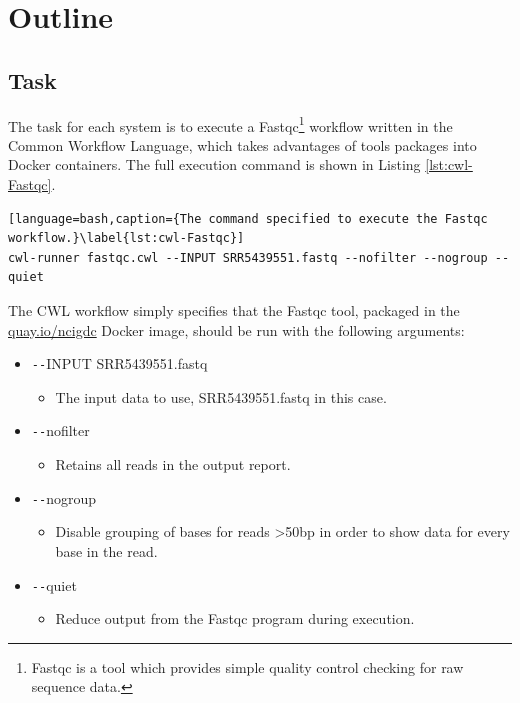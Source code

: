 \section{Outline}

\subsection{Task}

The task for each system is to execute a Fastqc\footnote{Fastqc is a tool which provides simple quality control checking for raw sequence data.} workflow written in the Common Workflow Language, which takes advantages of tools packages into Docker containers. The full execution command is shown in Listing \ref{lst:cwl-Fastqc}.

\begin{lstlisting}[language=bash,caption={The command specified to execute the Fastqc workflow.}\label{lst:cwl-Fastqc}]
cwl-runner fastqc.cwl --INPUT SRR5439551.fastq --nofilter --nogroup --quiet
\end{lstlisting}

The CWL workflow simply specifies that the Fastqc tool, packaged in the \url{quay.io/ncigdc} Docker image, should be run with the following arguments:

\begin{itemize}
    \item \texttt{-{}-}INPUT SRR5439551.fastq
    \begin{itemize}
        \item The input data to use, SRR5439551.fastq in this case.
    \end{itemize}
    \item \texttt{-{}-}nofilter
    \begin{itemize}
        \item Retains all reads in the output report.
    \end{itemize}
    \item \texttt{-{}-}nogroup 
    \begin{itemize}
        \item Disable grouping of bases for reads >50bp in order to show data for every base in the read.
    \end{itemize}
    \item \texttt{-{}-}quiet 
    \begin{itemize}
        \item Reduce output from the Fastqc program during execution.
    \end{itemize}
\end{itemize}


